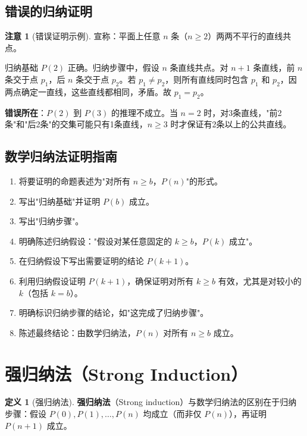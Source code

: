 \documentclass[UTF8,11pt,a4paper]{ctexbook}   %
\theoremstyle{definition}
\newtheorem{definition}{定义}[section]
\newtheorem{warning}{注意}[section]
\begin{document}
\subsection{错误的归纳证明}

\begin{warning}[错误证明示例]
宣称：平面上任意 $n$ 条（$n \geq 2$）两两不平行的直线共点。

归纳基础 $P(2)$ 正确。归纳步骤中，假设 $n$ 条直线共点。对 $n+1$ 条直线，前 $n$ 条交于点 $p_1$，后 $n$ 条交于点 $p_2$。若 $p_1 \neq p_2$，则所有直线同时包含 $p_1$ 和 $p_2$，因两点确定一直线，这些直线都相同，矛盾。故 $p_1 = p_2$。

\textbf{错误所在}：$P(2)$ 到 $P(3)$ 的推理不成立。当 $n=2$ 时，对3条直线，"前2条"和"后2条"的交集可能只有1条直线，$n \geq 3$ 时才保证有2条以上的公共直线。
\end{warning}

\subsection{数学归纳法证明指南}

\begin{enumerate}[leftmargin=2em]
    \item 将要证明的命题表述为"对所有 $n \geq b$，$P(n)$"的形式。
    \item 写出"归纳基础"并证明 $P(b)$ 成立。
    \item 写出"归纳步骤"。
    \item 明确陈述归纳假设："假设对某任意固定的 $k \geq b$，$P(k)$ 成立"。
    \item 在归纳假设下写出需要证明的结论 $P(k+1)$。
    \item 利用归纳假设证明 $P(k+1)$，确保证明对所有 $k \geq b$ 有效，尤其是对较小的 $k$（包括 $k=b$）。
    \item 明确标识归纳步骤的结论，如"这完成了归纳步骤"。
    \item 陈述最终结论：由数学归纳法，$P(n)$ 对所有 $n \geq b$ 成立。
\end{enumerate}

\section{强归纳法（Strong Induction）}

\begin{definition}[强归纳法]
\textbf{强归纳法}（Strong induction）与数学归纳法的区别在于归纳步骤：假设 $P(0), P(1), \dots, P(n)$ 均成立（而非仅 $P(n)$），再证明 $P(n+1)$ 成立。
\end{definition}
\end{document}
